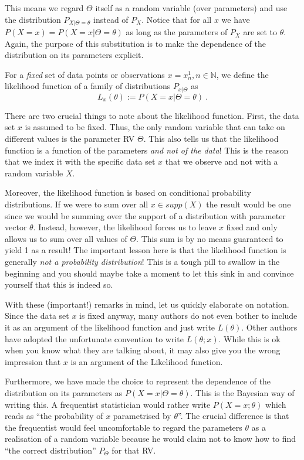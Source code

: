 This means we regard $ \Theta $ itself as a random variable (over parameters) and use the distribution $ P_{X|\Theta=\theta} $ instead of $ P_{X} $. Notice that for all
$ x $ we have $ P(X=x) = P(X=x|\Theta = \theta) $ as long as the parameters of $ P_{X} $ are set to $ \theta $. Again, the purpose of this substitution is to make
the dependence of the distribution on its parameters explicit.

\begin{Definition}\label{def:likelihood}
For a \emph{fixed} set of data points or observations $ x = x^{1}_{n}, n \in \mathbb{N} $, we define the likelihood function of a 
family of distributions $ P_{x|\Theta} $ as $$ L_{x}(\theta) := P(X=x|\Theta = \theta) \ . $$
\end{Definition}

There are two crucial things to note about the likelihood function. First, the data set $ x $ is assumed to be fixed. Thus, the only random variable that can take
on different values is the parameter RV $ \Theta $. This also tells us that the likelihood function is a function of the parameters \emph{and not of the data}! This is the reason that we index it with the
specific data set $ x $ that we observe and not with a random variable $ X $.

Moreover, the likelihood function is based on conditional probability distributions. If we were to sum over all $ x \in supp(X) $ the result would be one since 
we would be summing over the support of a distribution with parameter vector $ \theta $. Instead, however, the likelihood forces us to leave $ x $ fixed and
only allows us to sum over all values of $ \Theta $. This sum is by no means guaranteed to yield 1 as a result! The important lesson here is that the likelihood 
function is generally \emph{not a probability distribution}! This is a tough pill to swallow in the beginning and you should maybe take a moment to let this sink in
and convince yourself that this is indeed so.

With these (important!) remarks in mind, let us quickly elaborate on notation. Since the data set $ x $ is fixed anyway, many authors do not even bother to include
it as an argument of the likelihood function and just write $ L(\theta) $. Other authors have adopted
the unfortunate convention to write $ L(\theta; x) $. While this is ok when you know what they are talking
about, it may also give you the wrong impression that $ x $ is an argument of the Likelihood function. 

Furthermore, we have made the choice to represent the dependence of the distribution on its
parameters as $ P(X=x|\Theta=\theta) $. This is the Bayesian way of writing this. A frequentist statistician would rather write $ P(X=x; \theta) $ which reads as
``the probability of $ x $ parametrised by $ \theta $''. The crucial difference is that the frequentist would feel uncomfortable to regard the parameters $ \theta $
as a realisation of a random variable because he would claim not to know how to find ``the correct distribution'' $ P_{\Theta} $ for that RV.

